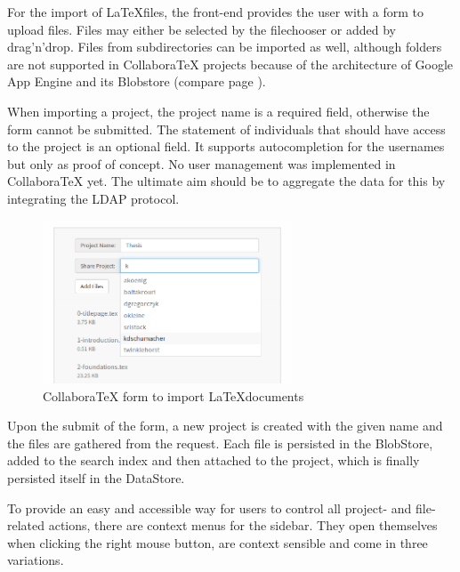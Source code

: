 

For the import of \LaTeX files, the front-end provides the user with a form to upload files. Files may either be selected by the filechooser or added by drag'n'drop. Files from subdirectories can be imported as well, although folders are not supported in CollaboraTeX projects because of the architecture of Google App Engine and its Blobstore (compare page \pageref{subsec:collaboratex}).

When importing a project, the project name is a required field, otherwise the form cannot be submitted. The statement of individuals that should have access to the project is an optional field. It supports autocompletion for the usernames but only as proof of concept. No user management was implemented in CollaboraTeX yet. The ultimate aim should be to aggregate the data for this by integrating the LDAP protocol.

\begin{figure}[H]
	\centering
		\includegraphics[width=0.66\textwidth]{images/screenshot-import-project.png}
	\caption{CollaboraTeX form to import \LaTeX documents}
\end{figure}

Upon the submit of the form, a new project is created with the given name and the files are gathered from the request. Each file is persisted in the BlobStore, added to the search index and then attached to the project, which is finally persisted itself in the DataStore.

\newpage


To provide an easy and accessible way for users to control all project- and file-related actions, there are context menus for the sidebar. They  open themselves when clicking the right mouse button, are context sensible and come in three variations.


